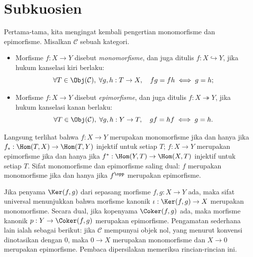 
\section{Subkuosien}\label{sec:subquot}
\hypertarget{o014.aljabr2.chapter1.subquotients}{ }

Pertama-tama, kita mengingat kembali pengertian monomorfisme dan
epimorfisme. Misalkan $\mathcal{C}$ sebuah kategori.

\begin{itemize}
	\item Morfisme $f: X \to Y$ disebut \emph{monomorfisme}, dan juga ditulis
	$f: X \hookrightarrow Y$, jika hukum kanselasi kiri berlaku:
	\[ \forall T \in \Obj(\mathcal{C}), \; \forall g,h: T \to X , \quad fg=fh \iff g=h; \]
	\item Morfisme $f: X \to Y$ disebut \emph{epimorfisme}, dan juga ditulis
	$f: X \twoheadrightarrow Y$, jika hukum kanselasi kanan berlaku:
	\[ \forall T \in \Obj(\mathcal{C}), \; \forall g,h: Y \to T, \quad gf=hf \iff g=h. \]
\end{itemize}


Langsung terlihat bahwa $f: X \to Y$ merupakan monomorfisme jika dan
hanya jika $f_*: \Hom(T, X) \to \Hom(T, Y)$ injektif untuk setiap $T$;
$f: X \to Y$ merupakan epimorfisme jika dan hanya jika
$f^*: \Hom(Y, T) \to \Hom(X, T)$ injektif untuk setiap $T$. Sifat
monomorfisme dan epimorfisme saling dual: $f$ merupakan monomorfisme jika dan
hanya jika $f^{\opp}$ merupakan epimorfisme.

\begin{contoh}
	Jika penyama $\Ker(f,g)$ dari sepasang morfisme $f, g: X \to Y$ ada,
	maka sifat universal menunjukkan bahwa morfisme kanonik
	$\iota: \Ker(f,g) \to X$ merupakan monomorfisme. Secara dual, jika
	kopenyama $\Coker(f,g)$ ada, maka morfisme kanonik
	$p: Y \to \Coker(f,g)$ merupakan epimorfisme. Pengamatan sederhana lain
	ialah sebagai berikut: jika $\mathcal{C}$ mempunyai objek nol, yang menurut
	konvensi dinotasikan dengan $0$, maka $0 \to X$ merupakan monomorfisme dan
	$X \to 0$ merupakan epimorfisme. Pembaca dipersilakan memeriksa
	rincian-rincian ini.
\end{contoh}

